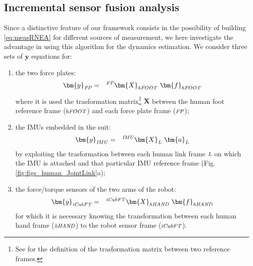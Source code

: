 \subsection{Incremental sensor fusion analysis}
Since a distinctive feature of our framework consists in the possibility of building
 \eqref{eq:measRNEA} for different sources of measurement, we here investigate the advantage in
  using this algorithm for the dynamics estimation. We consider three sets of $\bm y$ 
  equations for: 
\begin{enumerate}
	\item  the two force plates: 
	\begin{eqnarray}
		\bm{y}_{\mbox{\scriptsize{\emph{FP}}}} & = & {}^{{\mbox{\scriptsize{\emph{FP}}}}}
		\bm{X}_{\mbox{\scriptsize{\emph{hFOOT}}}}~\bm{f}_{\mbox{\scriptsize{\emph{hFOOT}}}}
	\end{eqnarray}
	where it is used the trasformation matrix\footnote{See \cite{Featherstone2008}
	 for the definition of the trasformation
	 matrix between two reference frames.} $\bm X$  between the human foot reference frame 
	(${\mbox{\footnotesize{\emph{hFOOT}}}}$) and each force plate frame
	 (${\mbox{\footnotesize{\emph{FP}}}}$);
	\item  the IMUs embedded in the suit:
	\begin{eqnarray}
		\bm{y}_{\mbox{\scriptsize{\emph{IMU}}}} & = &
		 {}^{\mbox{\scriptsize{\emph{IMU}}}}\bm{X}_{\mbox{\scriptsize{\emph{L}}}}~
		 \bm{a}_{\mbox{\scriptsize{\emph{L}}}}
	\end{eqnarray}
	by exploiting the trasformation between each human link frame
	 ${\mbox{\footnotesize{\emph{L}}}}$ 
	on which the IMU is attached and
	that particular IMU reference frame (Fig. \ref{fig:figs_human_JointLink}a);  
	\item  the force/torque sensors of the two arms of the robot:
	\begin{eqnarray}
		\bm{y}_{\mbox{\scriptsize{\emph{iCubFT}}}} & = &
		 {}^{\mbox{\scriptsize{\emph{iCubFT}}}}\bm{X}_{\mbox{\scriptsize{\emph{hHAND}}}}~
		 \bm{f}_{\mbox{\scriptsize{\emph{hHAND}}}}
	\end{eqnarray}
	for which it is necessary knowing the transformation between each human hand frame
	(${\mbox{\footnotesize{\emph{hHAND}}}}$)
	to the robot sensor frame (${\mbox{\footnotesize{\emph{iCubFT}}}}$).
\end{enumerate}

